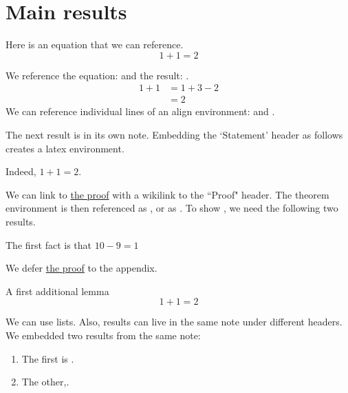 \documentclass{article}
\begin{document}
\section{Main results}
\label{loc:body.main_results}
Here is an equation that we can reference.
\begin{equation}
\label{eq:main}
1+1 = 2
\end{equation}
\begin{lemma}

\label{lem:explicit}
We reference the equation:  and the result: .
\begin{align}
1+1 & = 1+3-2 \label{eq:aligned_eq:1}\\
& = 2 \label{eq:aligned_eq:2}
\end{align}
We can reference individual lines of an align environment:  and .
\end{lemma}
The next result is in its own note. Embedding the `Statement' header as follows creates a latex environment.
\begin{theorem}

\label{loc:theorem_1.statement}
Indeed, $1+1  =  2$.
\end{theorem}
We can link to \hyperlink{loc:theorem_1.proof}{the proof} with a wikilink to the ``Proof" header.
The theorem environment is then referenced as , or as . To show , we need the following two results.
\begin{lemma}

\label{loc:lemma_1.statement}
The first fact is that $10-9 = 1$
\end{lemma}
We defer \hyperlink{loc:lemma_1.proof}{the proof} to the appendix.
\begin{lemma}

\label{loc:other_small_lemmas.first_other_lemma}
A first additional lemma
\begin{equation*}
1+1 = 2
\end{equation*}
\end{lemma}
We can use lists. Also, results can live in the same note under different headers. We embedded two results from the same note: 
\begin{enumerate}
\item The first is .
\item The other,.
\end{enumerate}
\end{document}
